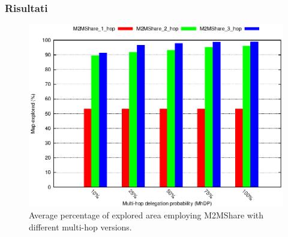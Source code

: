 \documentclass{beamer}
\begin{document}
\begin{frame}
\frametitle{Risultati}
\begin{center}
\begin{figure}[ht]
\includegraphics[scale=0.7]{mapCovered_MultiHop.eps}
\caption{Average percentage of explored area employing M2MShare with different multi-hop versions.}
\end{figure}
\end{center}
\end{frame}
\end{document}
